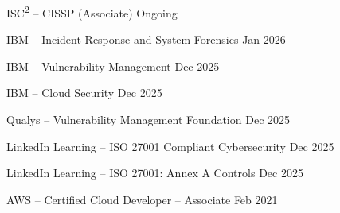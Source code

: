 


\begin{cvhonors}

  \cvhonor
    {ISC\textsuperscript{2} -- CISSP (Associate)}
    {Ongoing}

  \cvhonor
    {IBM -- Incident Response and System Forensics}
    {Jan 2026}

  \cvhonor
    {IBM -- Vulnerability Management}
    {Dec 2025}

  \cvhonor
    {IBM -- Cloud Security}
    {Dec 2025}

  \cvhonor
    {Qualys -- Vulnerability Management Foundation}
    {Dec 2025}

  \cvhonor
    {LinkedIn Learning -- ISO 27001 Compliant Cybersecurity}
    {Dec 2025}

  \cvhonor
    {LinkedIn Learning -- ISO 27001: Annex A Controls}
    {Dec 2025}

  \cvhonor
    {AWS -- Certified Cloud Developer – Associate}
    {Feb 2021}

\end{cvhonors}